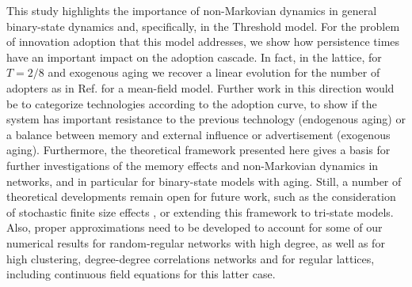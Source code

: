 

This study highlights the importance of non-Markovian dynamics in general  binary-state dynamics and, specifically, in the Threshold model. For the problem of innovation adoption that this model addresses, we show how persistence times have an important impact on the adoption cascade. In fact, in the lattice, for $T = 2/8$ and exogenous aging we recover a linear evolution for the number of adopters as in Ref. \cite{goncalves-2012} for a mean-field model. Further work in this direction would be to categorize technologies according to the adoption curve, to show if the system has important resistance to the previous technology (endogenous aging) or a balance between memory and external influence or advertisement (exogenous aging). Furthermore, the theoretical framework presented here gives a basis for further investigations of the memory effects and non-Markovian dynamics in networks, and in particular for  binary-state models with aging. Still, a number of theoretical developments remain open for future work, such as the consideration of stochastic finite size effects \cite{peralta-2020B}, or extending this framework to tri-state models. Also, proper approximations need to be developed to account for some of our numerical results for random-regular networks with high degree, as well as for high clustering, degree-degree correlations networks and for regular lattices, including continuous field equations for this latter case. 
